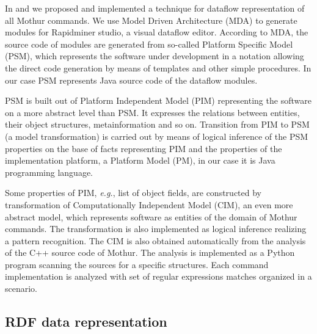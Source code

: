 \documentclass[a4paper]{jpconf}
\begin{document}

In \cite{cherk19} and \cite{zont19} we proposed and implemented a technique for dataflow representation of all Mothur commands.  We use Model Driven Architecture (MDA) to generate modules for Rapidminer studio, a visual dataflow editor.  According to MDA, the source code of modules are generated from so-called Platform Specific Model (PSM), which represents the software under development in a notation allowing the direct code generation by means of templates and other simple procedures.  In our case PSM represents Java source code of the dataflow modules.

PSM is built out of Platform Independent Model (PIM) representing the software on a more abstract level than PSM.  It expresses the relations between entities, their object structures, metainformation and so on.  Transition from PIM to PSM (a model transformation) is carried out by means of logical inference of the PSM properties on the base of facts representing PIM and the properties of the implementation platform, a Platform Model (PM), in our case it is Java programming language.

Some properties of PIM, \emph{e.g.}, list of object fields, are constructed by transformation of Computationally Independent Model (CIM), an even more abstract model, which represents software as entities of the domain of Mothur commands.  The transformation is also implemented as logical inference realizing a pattern recognition.  The CIM is also obtained automatically from the analysis of the C++ source code of Mothur. The analysis is implemented as a Python program scanning the sources for a specific structures.  Each command implementation is analyzed with set of regular expressions matches organized in a scenario.

\subsection{RDF data representation}
\end{document}
